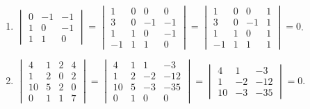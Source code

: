 	\paragraph{} %
		\begin{enumerate}
			\item %
			      $\begin{vmatrix}
					      0 & -1 & -1 \\
					      1 & 0  & -1 \\
					      1 & 1  & 0
				      \end{vmatrix} = \begin{vmatrix}
					      1  & 0 & 0  & 0  \\
					      3  & 0 & -1 & -1 \\
					      1  & 1 & 0  & -1 \\
					      -1 & 1 & 1  & 0
				      \end{vmatrix} = \begin{vmatrix}
					      1  & 0 & 0  & 1 \\
					      3  & 0 & -1 & 1 \\
					      1  & 1 & 0  & 1 \\
					      -1 & 1 & 1  & 1
				      \end{vmatrix} = 0$.

			\item %
			      $\begin{vmatrix}
					      4  & 1 & 2 & 4 \\
					      1  & 2 & 0 & 2 \\
					      10 & 5 & 2 & 0 \\
					      0  & 1 & 1 & 7
				      \end{vmatrix} = \begin{vmatrix}
					      4  & 1 & 1  & -3  \\
					      1  & 2 & -2 & -12 \\
					      10 & 5 & -3 & -35 \\
					      0  & 1 & 0  & 0
				      \end{vmatrix} = \begin{vmatrix}
					      4  & 1  & -3  \\
					      1  & -2 & -12 \\
					      10 & -3 & -35
				      \end{vmatrix} = 0$.


\end{enumerate}

